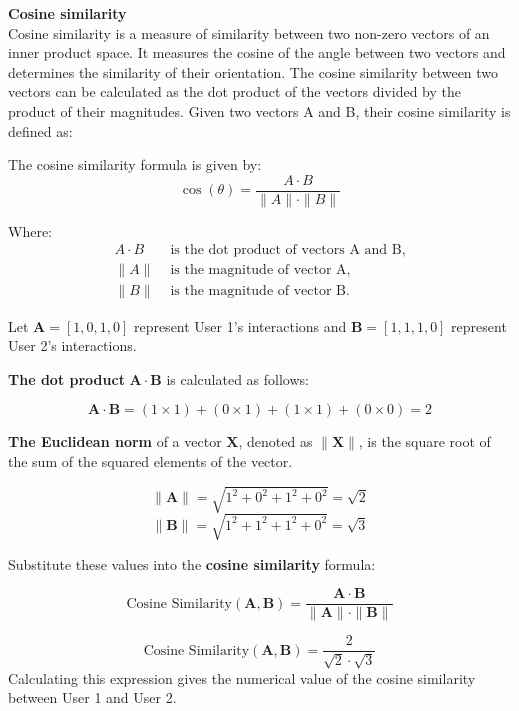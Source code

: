  \noindent\textbf{Cosine similarity}\\
Cosine similarity is a measure of similarity between two non-zero vectors of an inner product space. It measures the cosine of the angle between two vectors and determines the similarity of their orientation. The cosine similarity between two vectors can be calculated as the dot product of the vectors divided by the product of their magnitudes. Given two vectors A and B, their cosine similarity is defined as:

\noindent The cosine similarity formula is given by:
\begin{equation}
    \cos(\theta) = \frac{A \cdot B}{\|A\| \cdot \|B\|}
\end{equation}

Where:
\begin{align*}
    A \cdot B & \text{ is the dot product of vectors A and B,} \\
    \|A\| & \text{ is the magnitude of vector A,} \\
    \|B\| & \text{ is the magnitude of vector B.}
\end{align*}

\noindent Let \( \mathbf{A} = [1, 0, 1, 0] \) represent User 1's interactions and \( \mathbf{B} = [1, 1, 1, 0] \) represent User 2's interactions.

\noindent\textbf{The dot product} \( \mathbf{A} \cdot \mathbf{B} \) is calculated as follows:

\[ \mathbf{A} \cdot \mathbf{B} = (1 \times 1) + (0 \times 1) + (1 \times 1) + (0 \times 0) = 2 \]

\noindent\textbf{The Euclidean norm} of a vector \( \mathbf{X} \), denoted as \( \|\mathbf{X}\| \), is the square root of the sum of the squared elements of the vector.

\[ \|\mathbf{A}\| = \sqrt{1^2 + 0^2 + 1^2 + 0^2} = \sqrt{2} \]
\[ \|\mathbf{B}\| = \sqrt{1^2 + 1^2 + 1^2 + 0^2} = \sqrt{3} \]

\noindent Substitute these values into the \textbf{cosine similarity} formula:

\[ \text{Cosine Similarity}(\mathbf{A}, \mathbf{B}) = \frac{\mathbf{A} \cdot \mathbf{B}}{\|\mathbf{A}\| \cdot \|\mathbf{B}\|} \]

\[ \text{Cosine Similarity}(\mathbf{A}, \mathbf{B}) = \frac{2}{\sqrt{2} \cdot \sqrt{3}} \]
Calculating this expression gives the numerical value of the cosine similarity between User 1 and User 2.

